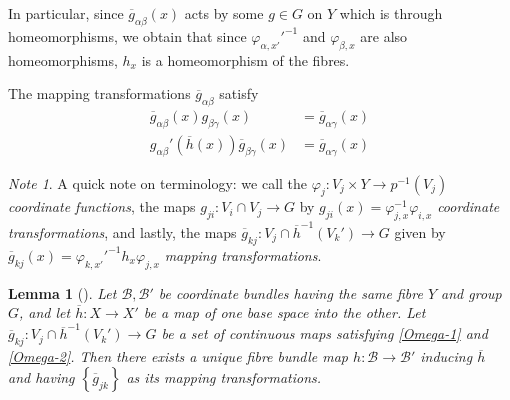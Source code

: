 \documentclass[reqno]{amsart}
\newtheorem{lemma}[theorem]{Lemma}
\theoremstyle{definition}
\theoremstyle{remark}
\newtheorem*{note}{Note}
\begin{document}
In particular, since
$\overline{g}_{\alpha \beta}(x)$ acts by
some $g \in G$ on $Y$ which is through homeomorphisms,
we obtain that since
$\varphi_{\alpha,x'}'^{-1}$ and
$\varphi_{\beta, x}$ are also homeomorphisms,
$h_x$ is a homeomorphism of the fibres.

The mapping transformations $\overline{g}_{\alpha \beta}$ satisfy
\begin{align*} 
    \overline{g}_{\alpha \beta}(x) g_{\beta \gamma}(x)
    &= \overline{g}_{\alpha \gamma}(x)\tag{$\Omega_1$}\label{Omega-1}\\
    g_{\alpha \beta}' \left( \overline{h}(x) \right) 
    \overline{g}_{\beta \gamma}(x) &= \overline{g}_{\alpha \gamma}
    (x)\tag{$\Omega_2$}\label{Omega-2}
\end{align*}

\begin{note}
    A quick note on terminology: we call the
    $\varphi_j \colon V_j \times Y \to p^{-1}(V_j)$ 
    \textit{coordinate functions}, the maps
    $g_{ji} \colon V_i \cap V_j \to G$ by
    $g_{ji}(x) = \varphi_{j,x}^{-1} \varphi_{i,x}$ 
    \textit{coordinate transformations}, and lastly,
    the maps $\overline{g}_{kj} \colon
    V_j \cap \overline{h}^{-1}(V_k') \to G$ 
    given by
    $\overline{g}_{kj}(x) =
    \varphi_{k,x'}'^{-1} h_x \varphi_{j,x}$ 
    \textit{mapping transformations}.
\end{note}


\begin{lemma}[]\label{Lemma:99328}
    Let $\mathcal{B}, \mathcal{B}'$ be coordinate bundles having
    the same fibre $Y$ and group  $G$, and let
    $\overline{h} \colon X \to X'$ be a map of one
    base space into the other. Let
    $\overline{g}_{kj} \colon
    V_j \cap \overline{h}^{-1}(V_k') \to G$ be a set
    of continuous maps satisfying \eqref{Omega-1} and
    \eqref{Omega-2}. Then
    there exists a unique fibre bundle map
    $h \colon \mathcal{B} \to \mathcal{B}'$ inducing
    $\overline{h}$ and having
    $\left\{ \overline{g}_{jk} \right\} $ as its
    mapping transformations.
\end{lemma}
\end{document}
